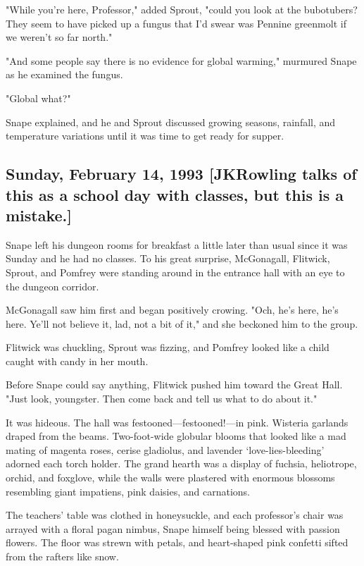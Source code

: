 "While you're here, Professor," added Sprout, "could you look at the bubotubers? They seem to have picked up a fungus that I'd swear was Pennine greenmolt if we weren't so far north."

"And some people say there is no evidence for global warming," murmured Snape as he examined the fungus.

"Global what?"

Snape explained, and he and Sprout discussed growing seasons, rainfall, and temperature variations until it was time to get ready for supper.

\sbreak

\subsection{Sunday, February 14, 1993 [JKRowling talks of this as a school day with classes, but this is a mistake.]}

Snape left his dungeon rooms for breakfast a little later than usual since it was Sunday and he had no classes. To his great surprise, McGonagall, Flitwick, Sprout, and Pomfrey were standing around in the entrance hall with an eye to the dungeon corridor.

McGonagall saw him first and began positively crowing. "Och, he's here, he's here. Ye'll not believe it, lad, not a bit of it," and she beckoned him to the group.

Flitwick was chuckling, Sprout was fizzing, and Pomfrey looked like a child caught with candy in her mouth.

Before Snape could say anything, Flitwick pushed him toward the Great Hall. "Just look, youngster. Then come back and tell us what to do about it."

It was hideous. The hall was festooned—festooned!—in pink. Wisteria garlands draped from the beams. Two-foot-wide globular blooms that looked like a mad mating of magenta roses, cerise gladiolus, and lavender `love-lies-bleeding' adorned each torch holder. The grand hearth was a display of fuchsia, heliotrope, orchid, and foxglove, while the walls were plastered with enormous blossoms resembling giant impatiens, pink daisies, and carnations.

The teachers' table was clothed in honeysuckle, and each professor's chair was arrayed with a floral pagan nimbus, Snape himself being blessed with passion flowers. The floor was strewn with petals, and heart-shaped pink confetti sifted from the rafters like snow.

